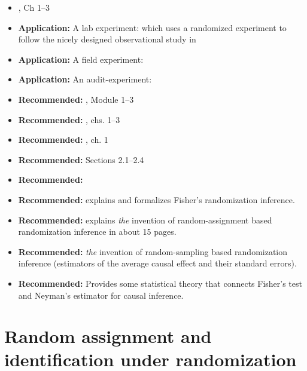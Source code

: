 \documentclass[10pt]{article}
\providecommand{\tightlist}{%
  \setlength{\itemsep}{0pt}\setlength{\parskip}{0pt}}
\begin{document}
\begin{itemize}
    \tightlist
    \item {}, Ch 1--3
    \item \textbf{Application:} A lab experiment: \href{https://journals.sagepub.com/doi/pdf/10.1177/0956797613495244}{} which uses a randomized experiment to follow the nicely designed observational study in  \href{https://doi.org/10.1111/pops.12062}{}

    \item \textbf{Application:} A field experiment: 
    \item \textbf{Application:} An audit-experiment: 

    \item \textbf{Recommended:}
        \href{https://egap.github.io/theory_and_practice_of_field_experiments/}{},
        Module 1--3 
    \item \textbf{Recommended:} , chs. 1--3
    \item \textbf{Recommended:} , ch. 1
    \item \textbf{Recommended:}  Sections 2.1--2.4
    \item \textbf{Recommended:} 
    \item \textbf{Recommended:}  explains and formalizes Fisher's randomization inference.
    \item \textbf{Recommended:}  explains \emph{the} invention of
    random-assignment based randomization inference in about 15 pages.
    \item \textbf{Recommended:}  \emph{the} invention of random-sampling
    based randomization inference (estimators of the average causal effect and
    their standard errors).
    \item \textbf{Recommended:}  Provides some statistical theory that connects Fisher's test and Neyman's
     estimator for causal inference.
\end{itemize}

\section{Random assignment and identification under randomization}
\end{document}
